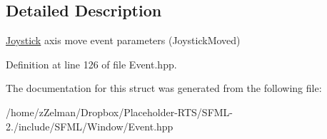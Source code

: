 \subsection{Detailed Description}
\hyperlink{classsf_1_1Joystick}{Joystick} axis move event parameters (Joystick\-Moved) 

Definition at line 126 of file Event.\-hpp.



The documentation for this struct was generated from the following file\-:\begin{DoxyCompactItemize}
\item 
/home/z\-Zelman/\-Dropbox/\-Placeholder-\/\-R\-T\-S/\-S\-F\-M\-L-\/2./include/\-S\-F\-M\-L/\-Window/Event.\-hpp\end{DoxyCompactItemize}
